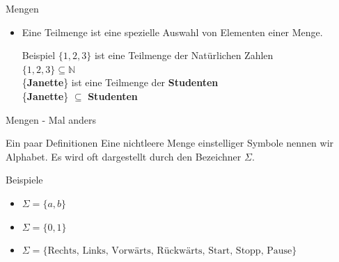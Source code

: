 \documentclass[10pt]{beamer}
\begin{document}
\begin{frame}[fragile]{Mengen}
\begin{itemize}
{            \begin{exampleblock}{Beispiel}
                $\mathbf{1}$ ist ein Element der \textbf{Natürlichen Zahlen}\\
                $\mathbf{1} \in \mathbb{N}$\\
                \vspace*{0.5cm}
                \textbf{Janette} ist ein Element aus der Menge der \textbf{Studenten}\\
                \textbf{Janette} $\in$ \textbf{Studenten}\\
                \vspace*{0.5cm}
                $\mathbf{a}$ ist in der Menge $\mathbf{\{u, v, w\}}$ nicht enthalten\\
                $\mathbf{a} \notin \mathbf{\{u, v, w\}}$
            \end{exampleblock}
        }
        \item<6>
            \vspace*{0.5cm}
            Eine Teilmenge ist eine \alert{spezielle Auswahl} von Elementen einer Menge.\\
            
            
            \begin{exampleblock}{Beispiel}
                $\{1, 2, 3\}$ ist eine Teilmenge der Natürlichen Zahlen\\
                $\{1,2,3\} \subseteq \mathbb{N}$\\
                \vspace*{0.5cm}
                \{\textbf{Janette}\} ist eine Teilmenge der \textbf{Studenten}\\
                \{\textbf{Janette}\} $\subseteq$ \textbf{Studenten}
            \end{exampleblock}
            
    \end{itemize}
\end{frame}

\begin{frame}{Mengen - Mal anders}
    \begin{alertblock}{Ein paar Definitionen}
    Eine nichtleere Menge einstelliger Symbole nennen wir \alert{Alphabet}.
    Es wird oft dargestellt durch den Bezeichner $\Sigma$.\\
    \end{alertblock}
    \begin{exampleblock}{Beispiele}
    \begin{itemize}
        \item $\Sigma = \{a,b\}$
        \item $\Sigma = \{0,1\}$
        \item $\Sigma = \{\text{Rechts, Links, Vorwärts, Rückwärts, Start, Stopp, Pause}\}$
    \end{itemize}
    \end{exampleblock}
\end{frame}
\end{document}
